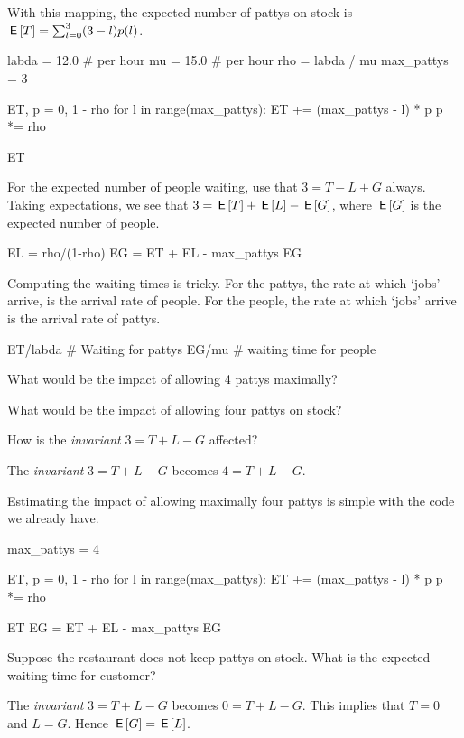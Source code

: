 \documentclass[stochastic-or.tex]{subfiles}
\begin{document}
\begin{exercise}
\begin{solution}
With this mapping, the expected number of pattys on stock is $\,\mathsf{E}\left[T\right] =  \sum_{l=0}^3 (3-l)p(l)$.
\begin{pyconsole}[taxis]
labda = 12.0  # per hour
mu = 15.0  # per hour
rho = labda / mu
max_pattys = 3

ET, p = 0, 1 - rho
for l in range(max_pattys):
    ET += (max_pattys - l) * p
    p *= rho

ET
\end{pyconsole}
For the expected number of people waiting, use  that $3=T-L+G$ always.
Taking expectations, we see that $3 = \,\mathsf{E}\left[T\right] + \,\mathsf{E}\left[L\right] - \,\mathsf{E}\left[G\right]$, where $\,\mathsf{E}\left[G\right]$ is the expected number of people.
\begin{pyconsole}[taxis]
EL = rho/(1-rho)
EG = ET + EL - max_pattys
EG
\end{pyconsole}

Computing the waiting times is tricky. For the pattys, the rate at which `jobs' arrive, is the arrival rate of people. For the people, the rate at which `jobs' arrive is the arrival rate of pattys.
\begin{pyconsole}[taxis]
ET/labda # Waiting for pattys
EG/mu # waiting time for people
\end{pyconsole}

What would be the impact of allowing 4 pattys maximally?
\end{solution}
\end{exercise}

\begin{exercise}
What would be the impact of allowing four pattys on stock?
\begin{hint}
How is the \emph{invariant}  $3 = T + L -G$ affected?
\end{hint}
\begin{solution}
The \emph{invariant}  $3 = T + L -G$ becomes $4 = T + L -G$.

Estimating the impact of allowing maximally four pattys is simple with the code we already have.
\begin{pyconsole}[taxis]
max_pattys = 4

ET, p = 0, 1 - rho
for l in range(max_pattys):
    ET += (max_pattys - l) * p
    p *= rho

ET
EG = ET + EL - max_pattys
EG
\end{pyconsole}
\end{solution}
\end{exercise}

\begin{exercise}
Suppose the restaurant does not keep pattys on stock. What is the expected waiting time for customer?
\begin{solution}
The \emph{invariant}  $3 = T + L -G$ becomes $0 = T + L -G$. This implies that $T=0$ and $L=G$.
 Hence $\,\mathsf{E}\left[G\right] = \,\mathsf{E}\left[L\right]$.
\end{solution}
\end{exercise}
\end{document}
